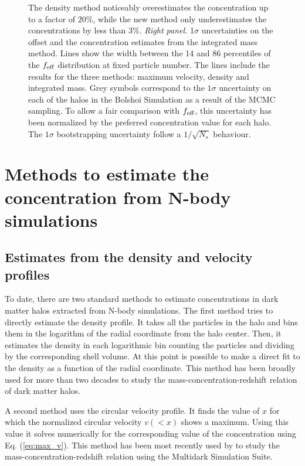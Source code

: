 \documentclass{emulateapj}
\begin{document}
\begin{figure}
{  The density method noticeably overestimates the concentration up to
  a factor of $20\%$, 
  while the new method only underestimates the concentrations by less
  than $3\%$.
  \emph{Right panel.}
  1$\sigma$ uncertainties on the offset and the concentration
  estimates from the integrated mass method.  
  Lines show the width between the 14 and 86 percentiles
  of the $f_{\rm off}$ distribution at fixed particle number. 
  The lines include the results for the three methods: maximum
  velocity, density and integrated mass.
  Grey symbols correspond to the $1\sigma$ uncertainty on each of
  the halos in the Bolshoi Simulation as a result of the MCMC
  sampling. 
  To allow a fair comparison with $f_{\rm off}$, this uncertainty has
  been normalized by the preferred concentration value for each halo. 
  The $1\sigma$ bootstrapping uncertainty follow a $1/\sqrt{N_s}$
  behaviour. 
  \label{fig:downsampling}}
\end{figure}



\section{Methods to estimate the concentration from N-body simulations}
\label{sec:method}

\subsection{Estimates from the density and velocity profiles}

To date, there are two standard methods to estimate concentrations in
dark matter halos extracted from N-body simulations.  The first method
tries to directly estimate the density profile.  It takes all the
particles in the halo and bins them in the logarithm of the radial
coordinate from the halo center.  Then, it estimates the density in
each logarithmic bin counting the particles and dividing by the
corresponding shell volume.  At this point is possible to make a
direct fit to the density as a function of the radial coordinate.
This method has been broadly used for more than two decades to study
the mass-concentration-redshift relation of dark matter halos.
 
A second method uses the circular velocity profile.  It finds the
value of $x$ for which the normalized circular velocity $v(<x)$ shows
a maximum.  Using this value it solves numerically for the
corresponding value of the concentration using Eq. (\ref{eq:max_v}).
This method has been most recently used by \cite{Klypin2016} to study
the mass-concentration-redshift relation using the Multidark
Simulation Suite.
\end{document}
